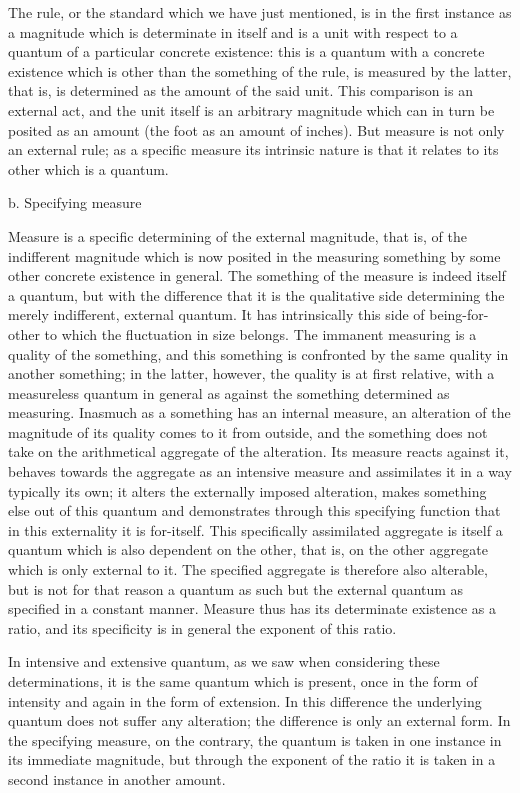 The rule, or the standard which we have just mentioned,
is in the first instance as a magnitude
which is determinate in itself
and is a unit with respect to a quantum
of a particular concrete existence:
this is a quantum with a concrete existence
which is other than the something of the rule,
is measured by the latter, that is,
is determined as the amount of the said unit.
This comparison is an external act,
and the unit itself is an arbitrary magnitude
which can in turn be posited as an amount
(the foot as an amount of inches).
But measure is not only an external rule;
as a specific measure its intrinsic nature is
that it relates to its other which is a quantum.

b. Specifying measure

Measure is a specific determining of the external magnitude, that is,
of the indifferent magnitude which is now posited
in the measuring something by some other concrete existence in general.
The something of the measure is indeed itself a quantum,
but with the difference that it is the qualitative side
determining the merely indifferent, external quantum.
It has intrinsically this side of being-for-other
to which the fluctuation in size belongs.
The immanent measuring is a quality of the something,
and this something is confronted by the same quality in another something;
in the latter, however, the quality is at first relative,
with a measureless quantum in general as against
the something determined as measuring.
Inasmuch as a something has an internal measure,
an alteration of the magnitude of its quality comes to it from outside,
and the something does not take on
the arithmetical aggregate of the alteration.
Its measure reacts against it,
behaves towards the aggregate as an intensive measure
and assimilates it in a way typically its own;
it alters the externally imposed alteration,
makes something else out of this quantum
and demonstrates through this specifying function
that in this externality it is for-itself.
This specifically assimilated aggregate is itself
a quantum which is also dependent on the other, that is,
on the other aggregate which is only external to it.
The specified aggregate is therefore also alterable,
but is not for that reason a quantum as such
but the external quantum as specified in a constant manner.
Measure thus has its determinate existence as a ratio,
and its specificity is in general the exponent of this ratio.

In intensive and extensive quantum,
as we saw when considering these determinations,
it is the same quantum which is present,
once in the form of intensity
and again in the form of extension.
In this difference the underlying quantum
does not suffer any alteration;
the difference is only an external form.
In the specifying measure, on the contrary,
the quantum is taken in one instance in its immediate magnitude,
but through the exponent of the ratio
it is taken in a second instance in another amount.

